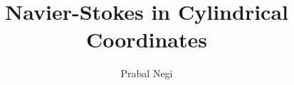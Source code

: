 \documentclass[]{article}
\title{Navier-Stokes in Cylindrical Coordinates}
\author{Prabal Negi}
\begin{document}
\maketitle

\begin{abstract}

\end{abstract}

\section{}
\end{document}
